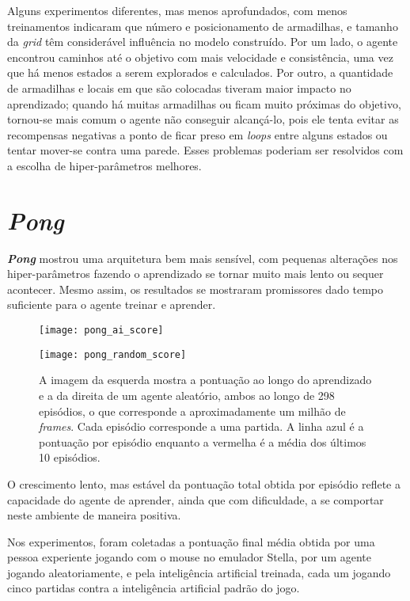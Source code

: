 Alguns experimentos diferentes, mas menos aprofundados, com menos treinamentos indicaram que número e posicionamento de armadilhas, e tamanho da \textit{grid} têm considerável influência no modelo construído.
Por um lado, o agente encontrou caminhos até o objetivo com mais velocidade e consistência, uma vez que há menos estados a serem explorados e calculados.
Por outro, a quantidade de armadilhas e locais em que são colocadas tiveram maior impacto no aprendizado; quando há muitas armadilhas ou ficam muito próximas do objetivo, tornou-se mais comum o agente não conseguir alcançá-lo, pois ele tenta evitar as recompensas negativas a ponto de ficar preso em \textit{loops} entre alguns estados ou tentar mover-se contra uma parede.
Esses problemas poderiam ser resolvidos com a escolha de hiper-parâmetros melhores.

\section{\textit{Pong}}
\label{sec:res_pong}

\textbf{\textit{Pong}} mostrou uma arquitetura bem mais sensível, com pequenas alterações nos hiper-parâmetros fazendo o aprendizado se tornar muito mais lento ou sequer acontecer.
Mesmo assim, os resultados se mostraram promissores dado tempo suficiente para o agente treinar e aprender.

\begin{figure}[h!]
  \begin{minipage}[b]{.5\textwidth}
  \centering
  \texttt{[image: pong\_ai\_score]}
  \end{minipage}
  \hfill
  \begin{minipage}[b]{.5\textwidth}
  \centering
  \texttt{[image: pong\_random\_score]}
  \end{minipage}
  \caption{A imagem da esquerda mostra a pontuação ao longo do aprendizado e a da direita de um agente aleatório, ambos ao longo de 298 episódios, o que corresponde a aproximadamente um milhão de \textit{frames}. Cada episódio corresponde a uma partida. A linha azul é a pontuação por episódio enquanto a vermelha é a média dos últimos 10 episódios.}
  \label{fig:pong_score}
\end{figure}

O crescimento lento, mas estável da pontuação total obtida por episódio reflete a capacidade do agente de aprender, ainda que com dificuldade, a se comportar neste ambiente de maneira positiva.

Nos experimentos, foram coletadas a pontuação final média obtida por uma pessoa experiente jogando com o mouse no emulador Stella, por um agente jogando aleatoriamente, e pela inteligência artificial treinada, cada um jogando cinco partidas contra a inteligência artificial padrão do jogo.

